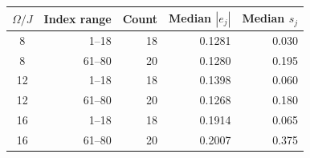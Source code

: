 \begin{tabular}{crrrr}
\toprule
$\Omega/J$ & Index range & Count & Median $|e_j|$ & Median $s_j$ \\
\midrule
8 & 1--18 & 18 & 0.1281 & 0.030 \\
8 & 61--80 & 20 & 0.1280 & 0.195 \\
12 & 1--18 & 18 & 0.1398 & 0.060 \\
12 & 61--80 & 20 & 0.1268 & 0.180 \\
16 & 1--18 & 18 & 0.1914 & 0.065 \\
16 & 61--80 & 20 & 0.2007 & 0.375 \\
\bottomrule
\end{tabular}
